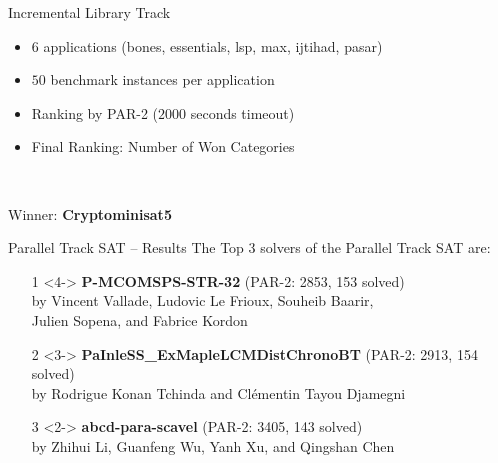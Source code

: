 \documentclass{beamer}
\begin{document}
\begin{frame}{Incremental Library Track}
\begin{itemize}
\item $6$ applications (bones, essentials, lsp, max, ijtihad, pasar)
\item $50$ benchmark instances per application
\item Ranking by PAR-2 ($2000$ seconds timeout)
\item Final Ranking: Number of Won Categories
\end{itemize}~\\


\medskip

Winner: {\bf Cryptominisat5}

\end{frame}



\begin{frame}{Parallel Track SAT -- Results}
The Top 3 solvers of the Parallel Track SAT are:
\begin{itemize}
\item[1]<4-> {\bf P-MCOMSPS-STR-32} (PAR-2: 2853, 153 solved)\\
by Vincent Vallade, Ludovic Le Frioux, Souheib Baarir,\\Julien Sopena, and Fabrice Kordon
\item[2]<3-> {\bf PaInleSS\_ExMapleLCMDistChronoBT} (PAR-2: 2913, 154 solved)\\
by Rodrigue Konan Tchinda and Cl\'ementin Tayou Djamegni
\item[3]<2-> {\bf abcd-para-scavel} (PAR-2: 3405, 143 solved)\\
by Zhihui Li, Guanfeng Wu, Yanh Xu, and Qingshan Chen
\end{itemize}
\end{frame}
\end{document}
